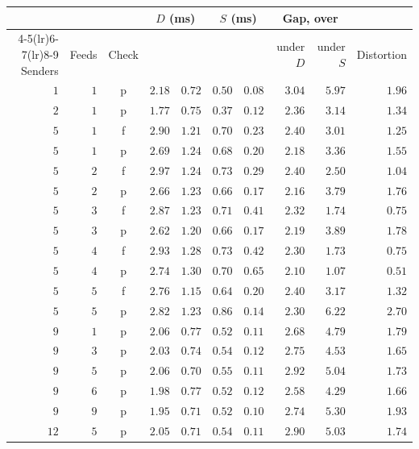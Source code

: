 \begin{tabular}{@{}rrcrrrrrrr@{}}
\toprule
& & & \multicolumn{2}{c}{$D$ (ms)} & \multicolumn{2}{c}{$S$ (ms)} & \multicolumn{2}{c}{Gap, \kafka{} over \redis{}} & \\
\cmidrule(lr){4-5}\cmidrule(lr){6-7}\cmidrule(lr){8-9}
Senders & Feeds & Check & \kafka{} & \redis{} & \kafka{} & \redis{} & under $D$ & under $S$ & Distortion \\
\midrule
$1$ & $1$ & p & $2.18$ & $0.72$ & $0.50$ & $0.08$ & $3.04$ & $5.97$ & $1.96$ \\
$2$ & $1$ & p & $1.77$ & $0.75$ & $0.37$ & $0.12$ & $2.36$ & $3.14$ & $1.34$ \\
$5$ & $1$ & f & $2.90$ & $1.21$ & $0.70$ & $0.23$ & $2.40$ & $3.01$ & $1.25$ \\
$5$ & $1$ & p & $2.69$ & $1.24$ & $0.68$ & $0.20$ & $2.18$ & $3.36$ & $1.55$ \\
$5$ & $2$ & f & $2.97$ & $1.24$ & $0.73$ & $0.29$ & $2.40$ & $2.50$ & $1.04$ \\
$5$ & $2$ & p & $2.66$ & $1.23$ & $0.66$ & $0.17$ & $2.16$ & $3.79$ & $1.76$ \\
$5$ & $3$ & f & $2.87$ & $1.23$ & $0.71$ & $0.41$ & $2.32$ & $1.74$ & $0.75$ \\
$5$ & $3$ & p & $2.62$ & $1.20$ & $0.66$ & $0.17$ & $2.19$ & $3.89$ & $1.78$ \\
$5$ & $4$ & f & $2.93$ & $1.28$ & $0.73$ & $0.42$ & $2.30$ & $1.73$ & $0.75$ \\
$5$ & $4$ & p & $2.74$ & $1.30$ & $0.70$ & $0.65$ & $2.10$ & $1.07$ & $0.51$ \\
$5$ & $5$ & f & $2.76$ & $1.15$ & $0.64$ & $0.20$ & $2.40$ & $3.17$ & $1.32$ \\
$5$ & $5$ & p & $2.82$ & $1.23$ & $0.86$ & $0.14$ & $2.30$ & $6.22$ & $2.70$ \\
$9$ & $1$ & p & $2.06$ & $0.77$ & $0.52$ & $0.11$ & $2.68$ & $4.79$ & $1.79$ \\
$9$ & $3$ & p & $2.03$ & $0.74$ & $0.54$ & $0.12$ & $2.75$ & $4.53$ & $1.65$ \\
$9$ & $5$ & p & $2.06$ & $0.70$ & $0.55$ & $0.11$ & $2.92$ & $5.04$ & $1.73$ \\
$9$ & $6$ & p & $1.98$ & $0.77$ & $0.52$ & $0.12$ & $2.58$ & $4.29$ & $1.66$ \\
$9$ & $9$ & p & $1.95$ & $0.71$ & $0.52$ & $0.10$ & $2.74$ & $5.30$ & $1.93$ \\
$12$ & $5$ & p & $2.05$ & $0.71$ & $0.54$ & $0.11$ & $2.90$ & $5.03$ & $1.74$ \\

\end{tabular}

